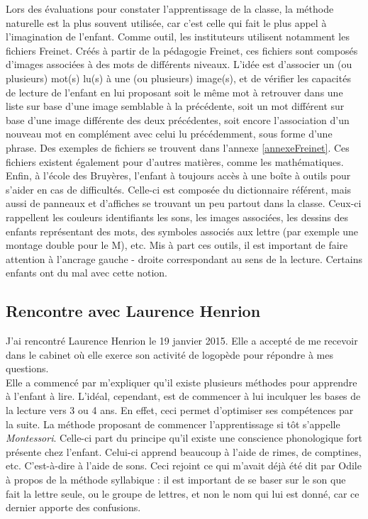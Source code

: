 Lors des évaluations pour constater l'apprentissage de la classe, la méthode naturelle est la plus souvent utilisée, car c'est celle qui fait le plus appel à l'imagination de l'enfant. Comme outil, les instituteurs utilisent notamment les fichiers Freinet. Créés à partir de la pédagogie Freinet, ces fichiers sont composés d'images associées à des mots de différents niveaux. L'idée est d'associer un (ou plusieurs) mot(s) lu(s) à une (ou plusieurs) image(s), et de vérifier les capacités de lecture de l'enfant en lui proposant soit le même mot à retrouver dans une liste sur base d'une image semblable à la précédente, soit un mot différent sur base d'une image différente des deux précédentes, soit encore l'association d'un nouveau mot en complément avec celui lu précédemment, sous forme d'une phrase. Des exemples de fichiers se trouvent dans l'annexe \ref{annexeFreinet}. Ces fichiers existent également pour d'autres matières, comme les mathématiques.\\

Enfin, à l'école des Bruyères, l'enfant à toujours accès à une boîte à outils pour s'aider en cas de difficultés. Celle-ci est composée du dictionnaire référent, mais aussi de panneaux et d'affiches se trouvant un peu partout dans la classe. Ceux-ci rappellent les couleurs identifiants les sons, les images associées, les dessins des enfants représentant des mots, des symboles associés aux lettre (par exemple une montage double pour le M), etc. Mis à part ces outils, il est important de faire attention à l'ancrage gauche - droite correspondant au sens de la lecture. Certains enfants ont du mal avec cette notion.


\subsection{Rencontre avec Laurence Henrion}
J'ai rencontré Laurence Henrion le 19 janvier 2015. Elle a accepté de me recevoir dans le cabinet où elle exerce son activité de logopède pour répondre à mes questions.\\

Elle a commencé par m'expliquer qu'il existe plusieurs méthodes pour apprendre à l'enfant à lire. L'idéal, cependant, est de commencer à lui inculquer les bases de la lecture vers 3 ou 4 ans. En effet, ceci permet d'optimiser ses compétences par la suite. La méthode proposant de commencer l'apprentissage si tôt s'appelle \textit{Montessori}. Celle-ci part du principe qu'il existe une conscience phonologique fort présente chez l'enfant. Celui-ci apprend beaucoup à l'aide de rimes, de comptines, etc. C'est-à-dire à l'aide de sons. Ceci rejoint ce qui m'avait déjà été dit par Odile à propos de la méthode syllabique : il est important de se baser sur le son que fait la lettre seule, ou le groupe de lettres, et non le nom qui lui est donné, car ce dernier apporte des confusions.\\

